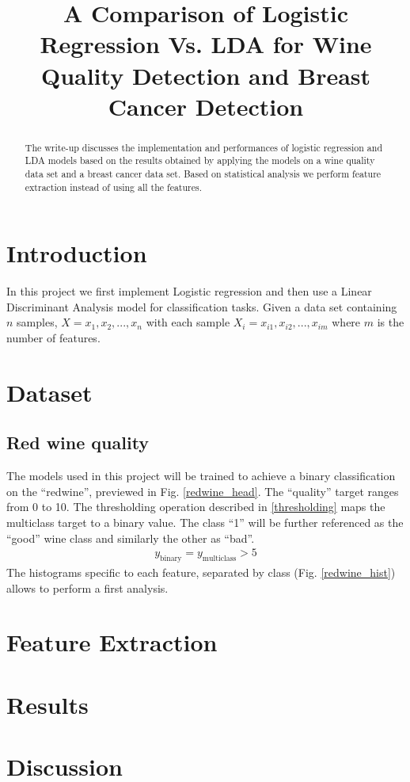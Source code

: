\documentclass[conference]{IEEEtran}
\begin{document}
\title{A Comparison of Logistic Regression Vs. LDA for Wine Quality Detection and Breast Cancer Detection}

\author{
	}

\maketitle
\begin{abstract}
	The write-up discusses the implementation and performances of logistic regression and LDA models based on the results obtained by applying the models on a wine quality data set and a breast cancer data set. Based on statistical analysis we perform feature extraction instead of using all the features.  
\end{abstract}
\section{Introduction}
In this project we first implement Logistic regression and then use a Linear Discriminant Analysis model for classification tasks. Given a data set containing $n$ samples, $X = {x_1, x_2,...,x_n}$ with each sample $X_i = {x_{i1},x_{i2},...,x_{im}}$ where $m$ is the number of features.
\section{Dataset}
\subsection{Red wine quality}
The models used in this project will be trained to achieve a binary classification on the ``redwine'', previewed in Fig. \ref{redwine_head}.
The ``quality'' target ranges from 0 to 10. The thresholding operation described in \eqref{thresholding} maps the multiclass target to a binary value. The class ``1'' will be further referenced as the ``good'' wine class and similarly the other as ``bad''.
\begin{align}
	y_{\text{binary}} = y_{\text{multiclass}} > 5
\end{align}
The histograms specific to each feature, separated by class (Fig. \ref{redwine_hist}) allows to perform a first analysis.




\section{Feature Extraction}
\section{Results}
\section{Discussion}




\end{document}
